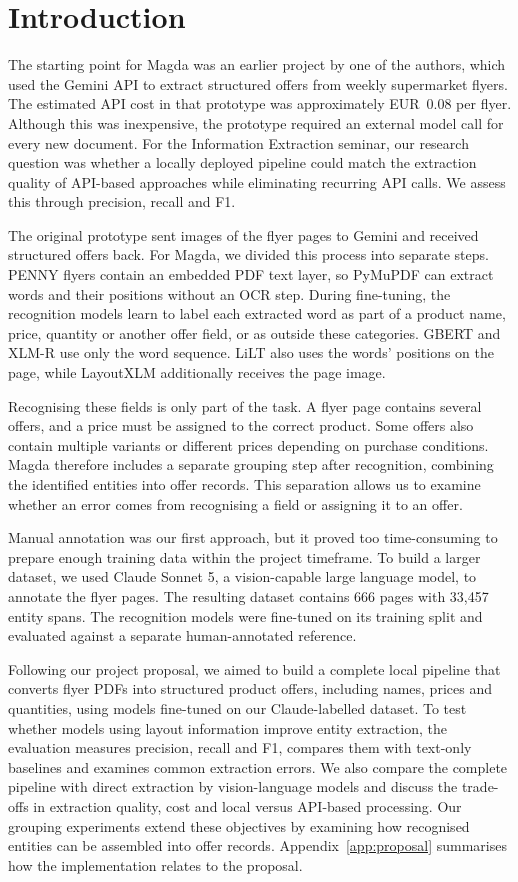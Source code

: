 \section{Introduction}
The starting point for Magda was an earlier project by one of the authors, which used the Gemini API to extract structured offers from weekly supermarket flyers. The estimated API cost in that prototype was approximately EUR~0.08 per flyer. Although this was inexpensive, the prototype required an external model call for every new document. For the Information Extraction seminar, our research question was whether a locally deployed pipeline could match the extraction quality of API-based approaches while eliminating recurring API calls. We assess this through precision, recall and F1.

The original prototype sent images of the flyer pages to Gemini and received structured offers back. For Magda, we divided this process into separate steps. PENNY flyers contain an embedded PDF text layer, so PyMuPDF can extract words and their positions without an OCR step. During fine-tuning, the recognition models learn to label each extracted word as part of a product name, price, quantity or another offer field, or as outside these categories. GBERT and XLM-R use only the word sequence. LiLT also uses the words' positions on the page, while LayoutXLM additionally receives the page image.

Recognising these fields is only part of the task. A flyer page contains several offers, and a price must be assigned to the correct product. Some offers also contain multiple variants or different prices depending on purchase conditions. Magda therefore includes a separate grouping step after recognition, combining the identified entities into offer records. This separation allows us to examine whether an error comes from recognising a field or assigning it to an offer.

Manual annotation was our first approach, but it proved too time-consuming to prepare enough training data within the project timeframe. To build a larger dataset, we used Claude Sonnet 5, a vision-capable large language model, to annotate the flyer pages. The resulting dataset contains 666 pages with 33,457 entity spans. The recognition models were fine-tuned on its training split and evaluated against a separate human-annotated reference.

Following our project proposal, we aimed to build a complete local pipeline that converts flyer PDFs into structured product offers, including names, prices and quantities, using models fine-tuned on our Claude-labelled dataset. To test whether models using layout information improve entity extraction, the evaluation measures precision, recall and F1, compares them with text-only baselines and examines common extraction errors. We also compare the complete pipeline with direct extraction by vision-language models and discuss the trade-offs in extraction quality, cost and local versus API-based processing. Our grouping experiments extend these objectives by examining how recognised entities can be assembled into offer records. Appendix~\ref{app:proposal} summarises how the implementation relates to the proposal.
